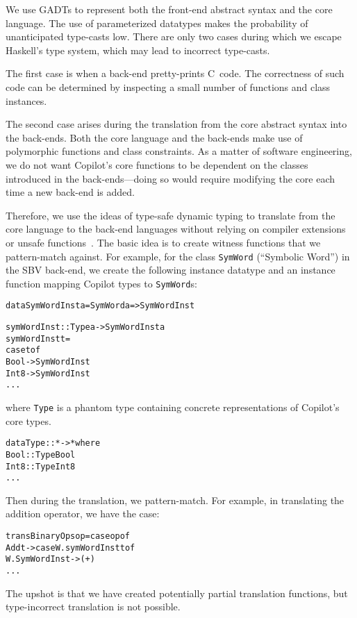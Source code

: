 \documentclass[preprint]{sigplanconf}
\newenvironment{code}{\begin{alltt}\footnotesize}{\end{alltt}}
\begin{document}
We use GADTs to represent both the front-end abstract syntax and the core
language.  The use of parameterized datatypes makes the probability of
unanticipated type-casts low.  There are only two cases during which we escape
Haskell's type system, which may lead to incorrect type-casts.  

The first case is when a back-end pretty-prints C~code.  The correctness of such
code can be determined by inspecting a small number of functions and class
instances.

The second case arises during the translation from the core abstract syntax into
the back-ends.  Both the core language and the back-ends make use of polymorphic
functions and class constraints.  As a matter of software engineering, we do not
want Copilot's core functions to be dependent on the classes introduced in the
back-ends---doing so would require modifying the core each time a new back-end
is added.

Therefore, we use the ideas of type-safe dynamic typing to translate from the
core language to the back-end languages without relying on compiler extensions
or unsafe functions~\cite{typing}.  The basic idea is to
create witness functions that we pattern-match against.  For example, for the
class {\tt SymWord} (``Symbolic Word'') in the SBV back-end, we create the following
instance datatype and an instance function mapping Copilot types to {\tt SymWord}s:
%
\begin{code}
data SymWordInst a = SymWord a => SymWordInst

symWordInst :: Type a -> SymWordInst a
symWordInst t =
  case t of
    Bool   -> SymWordInst
    Int8   -> SymWordInst
    ...
\end{code}
%
where {\tt Type} is a phantom type containing concrete representations of
Copilot's core types.
%
\begin{code}
data Type :: * -> * where
  Bool    :: Type Bool
  Int8    :: Type Int8
  ...  
\end{code}
%
Then during the translation, we pattern-match.  For example, in translating the
addition operator, we have the case:
%
\begin{code}
transBinaryOps op = case op of
  Add t -> case W.symWordInst t of 
             W.SymWordInst ->  (+)
  ...
\end{code}
%
The upshot is that we have created potentially partial translation functions,
but type-incorrect translation is not possible.
\end{document}

